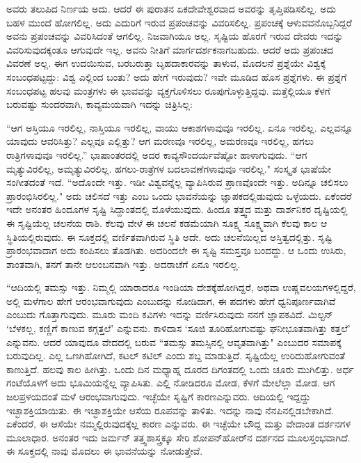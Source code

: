 ಅವರು ತಲುಪಿದ ನಿರ್ಣಯ ಅದು. ಆದರೆ ಈ ಪುರಾತನ ಏಕದೇವೇಶ್ವರವಾದ ಅವರನ್ನು ತೃಪ್ತಿಪಡಿಸಲಿಲ್ಲ. ಅದು ಬಹಳ ಮುಂದೆ ಹೋಗಲಿಲ್ಲ. ಅದು ಎದುರಿಗೆ ಇರುವ ಪ್ರಪಂಚವನ್ನು ವಿವರಿಸಲಿಲ್ಲ. ಪ್ರಪಂಚಕ್ಕೆ ಆಳುವವನೊಬ್ಬನಿದ್ದರೆ ಅವನು ಪ್ರಪಂಚವನ್ನು ವಿವರಿಸಿದಂತೆ ಆಗಲಿಲ್ಲ. ನಿಜವಾಗಿಯೂ ಅಲ್ಲ. ಸೃಷ್ಟಿಯ ಹೊರಗೆ ಇರುವ ದೇವರು ಇದನ್ನು ವಿವರಿಸುವುದಕ್ಕಂತೂ ಆಗುವುದೇ ಇಲ್ಲ. ಅವನು ನೀತಿಗೆ ಮಾರ್ಗದರ್ಶಕನಾಗಬಹುದು. ಆದರೆ ಅದು ಪ್ರಪಂಚದ ವಿವರಣೆ ಅಲ್ಲ. ಈಗ ಉದಯಿಸುವ, ಬರಬರುತ್ತಾ ಬೃಹದಾಕಾರವನ್ನು ತಾಳುವ, ಮೊದಲನೆ ಪ್ರಶ್ನೆಯೇ ವಿಶ್ವಕ್ಕೆ ಸಂಬಂಧಪಟ್ಟದ್ದು: ವಿಶ್ವ ಎಲ್ಲಿಂದ ಬಂತು? ಅದು ಹೇಗೆ ಇರುವುದು? ಇವೇ ಮೂಡಿದ ಹೊಸ ಪ್ರಶ್ನೆಗಳು. ಈ ಪ್ರಶ್ನೆಗೆ ಸಂಬಂಧಪಟ್ಟ ಹಲವು ಮಂತ್ರಗಳು ಈ ಭಾವವನ್ನು ವ್ಯಕ್ತಗೊಳಿಸಲು ರೂಪುಗೊಳ್ಳುತ್ತಿದ್ದವು. ಮತ್ತೆಲ್ಲಿಯೂ ಕೆಳಗೆ ಬರುವಷ್ಟು ಸುಂದರವಾಗಿ, ಕಾವ್ಯಮಯವಾಗಿ ಇದನ್ನು ಚಿತ್ರಿಸಿಲ್ಲ:

“ಆಗ ಅಸ್ತಿಯೂ ಇರಲಿಲ್ಲ, ನಾಸ್ತಿಯೂ ಇರಲಿಲ್ಲ, ವಾಯು ಆಕಾಶಗಳಾವುವೂ ಇರಲಿಲ್ಲ. ಏನೂ ಇರಲಿಲ್ಲ. ಎಲ್ಲವನ್ನೂ ಯಾವುದು ಆವರಿಸಿತ್ತು? ಎಲ್ಲವೂ ಎಲ್ಲಿತ್ತು? ಆಗ ಮರಣವೂ ಇರಲಿಲ್ಲ, ಅಮರಣವೂ ಇರಲಿಲ್ಲ, ಹಗಲು ರಾತ್ರಿಗಳಾವುವೂ ಇರಲಿಲ್ಲ.” ಭಾಷಾಂತರದಲ್ಲಿ ಅದರ ಕಾವ್ಯಸೌಂದರ್ಯವೆಷ್ಟೋ ಹಾಳಾಗುವುದು. “ಆಗ ಮೃತ್ಯುವಿರಲಿಲ್ಲ, ಅಮೃತ್ಯುವಿರಲಿಲ್ಲ. ಹಗಲು-ರಾತ್ರೆಗಳ ಬದಲಾವಣೆಗಳಾವುವೂ ಇರಲಿಲ್ಲ." ಸಂಸ್ಕೃತ ಭಾಷೆಯೇ ಸಂಗೀತದಂತೆ ಇದೆ. “ಅದೊಂದೇ ಇತ್ತು. ಇಡೀ ವಿಶ್ವವನ್ನೆಲ್ಲ ವ್ಯಾಪಿಸಿರುವ ಪ್ರಾಣವೊಂದೇ ಇತ್ತು. ಅದಿನ್ನೂ ಚಲಿಸಲು ಪ್ರಾರಂಭಿಸಿರಲಿಲ್ಲ." ಅದು ಚಲಿಸದೆ ಇತ್ತು ಎಂಬ ಒಂದು ಭಾವನೆಯನ್ನು ಜ್ಞಾಪಕದಲ್ಲಿಡುವುದು ಒಳ್ಳೆಯದು. ಏಕೆಂದರೆ ಇದೇ ಅನಂತರ ಹಿಂದೂಗಳ ಸೃಷ್ಟಿ ಸಿದ್ದಾಂತದಲ್ಲಿ ಮೊಳೆಯುವುದು. ಹಿಂದೂ ತತ್ತ್ವದ ಮತ್ತು ದಾರ್ಶನಿಕರ ದೃಷ್ಟಿಯಲ್ಲಿ ಈ ಸೃಷ್ಟಿಯೆಲ್ಲ ಚಲನೆಯ ರಾಶಿ. ಕೆಲವು ವೇಳೆ ಈ ಚಲನೆ ಕಡಮೆಯಾಗಿ ಸೂಕ್ಷ್ಮ ಸೂಕ್ಷ್ಮವಾಗಿ ಕೆಲವು ಕಾಲ ಆ ಸ್ಥಿತಿಯಲ್ಲಿರುವುದು. ಈ ಸೂಕ್ತದಲ್ಲಿ ವರ್ಣಿತವಾಗಿರುವ ಸ್ಥಿತಿ ಅದೇ. ಅದು ಚಲನೆಯಿಲ್ಲದ ಅಸ್ತಿತ್ವದಲ್ಲಿತ್ತು. ಸೃಷ್ಟಿ ಪ್ರಾರಂಭವಾದಾಗ ಅದು ಕಂಪಿಸಲು ತೊಡಗಿತು. ಅದರಿಂದಲೇ ಈ ಸೃಷ್ಟಿ ಸಮಸ್ತವೂ ಬಂದದ್ದು. ಆ ಒಂದು ಉಸಿರು, ಶಾಂತವಾಗಿ, ತನಗೆ ತಾನೇ ಆಲಂಬನವಾಗಿ ಇತ್ತು. ಅದರಾಚೆಗೆ ಏನೂ ಇರಲಿಲ್ಲ.

“ಆದಿಯಲ್ಲಿ ತಮಸ್ಸು ಇತ್ತು. ನಿಮ್ಮಲ್ಲಿ ಯಾರಾದರೂ ಇಂಡಿಯಾ ದೇಶಕ್ಕೆ\break ಹೋಗಿದ್ದರೆ, ಅಥವಾ ಉಷ್ಣವಲಯಗಳಲ್ಲಿದ್ದರೆ, ಅಲ್ಲಿ ಮಳೆಗಾಲ ಹೇಗೆ ಆರಂಭವಾಗುವುದು ಎಂಬುದನ್ನು ನೋಡಿದಾಗ, ಈ ಪದಗಳು ಹೇಗೆ ಧ್ವನಿಪೂರ್ಣವಾಗಿವೆ ಎಂಬುದು ಗೊತ್ತಾಗುವುದು. ಮೂರು ಮಂದಿ ಕವಿಗಳು ಇದನ್ನು ವರ್ಣಿಸಿರುವುದು ನನಗೆ ಜ್ಞಾಪಕವಿದೆ. ಮಿಲ್ಟನ್  `ಬೆಳಕಲ್ಲ, ಕಣ್ಣಿಗೆ ಕಾಣುವ ಕಗ್ಗತ್ತಲೆ' ಎನ್ನುವನು. ಕಾಳಿದಾಸ `ಸೂಜಿ ತೂರಿಹೋಗುವಷ್ಟು ಘನೀಭೂತವಾಗಿತ್ತು ಕತ್ತಲೆ' ಎನ್ನುವನು. ಆದರೆ ಯಾವುದೂ ವೇದದಲ್ಲಿ ಬರುವ “ತಮಸ್ಸು ತಮಸ್ಸಿನಲ್ಲಿ ಆವೃತವಾಗಿತ್ತು" ಎಂಬುದರ ಸಮಾಪಕ್ಕೆ ಬರುವುದಿಲ್ಲ. ಎಲ್ಲ ಒಣಗಿಹೋಗಿದೆ, ಕಟಲ್ ಕಟಿಲ್ ಎಂದು ಶಬ್ದ ಮಾಡುತ್ತಿದೆ. ಸೃಷ್ಟಿಯೆಲ್ಲ ಉರಿದುಹೋಗುವಂತೆ ಕಾಣುತ್ತಿದೆ. ಹಲವು ಕಾಲ ಹೀಗಿತ್ತು. ಒಂದು ದಿನ ಮಧ್ಯಾಹ್ನ ದೂರದ ದಿಗಂತದಲ್ಲಿ ಒಂದು ಚೂರು ಮುಗಿಲಿತ್ತು. ಅರ್ಧ ಗಂಟೆಯೊಳಗೆ ಅದು ಭೂಮಿಯನ್ನೆಲ್ಲ ವ್ಯಾಪಿಸಿತು. ಎಲ್ಲಿ ನೋಡಿದರೂ ಮೋಡ, ಕೆಳಗೆ ಮೇಲೆಲ್ಲಾ ಮೋಡ. ಆಗ ಜಲಪ್ರಳಯದಂತೆ ಮಳೆ ಆರಂಭವಾಗುವುದು. ಇಚ್ಛೆಯೇ ಸೃಷ್ಟಿಗೆ ಕಾರಣ\break ಎನ್ನುವರು. ಆದಿಯಲ್ಲಿ ಇದ್ದದ್ದು ಇಚ್ಛಾಶಕ್ತಿಯಾಯಿತು. ಈ ಇಚ್ಛಾಶಕ್ತಿಯೇ ಆಸೆಯ ರೂಪವನ್ನು ತಾಳಿತು. ಇದನ್ನು ನಾವು ನೆನಪಿನಲ್ಲಿಡಬೇಕಾಗಿದೆ. ಏಕೆಂದರೆ, ಈ ಆಸೆಯೇ ನಮ್ಮಲ್ಲಿರುವುದಕ್ಕೆಲ್ಲ ಕಾರಣ ಎನ್ನುವರು. ಈ ಇಚ್ಛೆಯೇ ಬೌದ್ದ ಮತ್ತು ವೇದಾಂತ ದರ್ಶನಗಳ ಮೂಲಾಧಾರ. ಅನಂತರ ಇದು ಜರ್ಮನ್ ತತ್ತ್ವಶಾಸ್ತ್ರಕ್ಕೂ ಸೇರಿ ಶೋಪನ್‌ಹೋರ್‌ನ ದರ್ಶನದ ಮೂಲಸ್ತಂಭವಾಗಿದೆ. ಈ ಸೂಕ್ತದಲ್ಲಿ ನಾವು ಮೊದಲು ಈ ಭಾವನೆಯನ್ನು ನೋಡುತ್ತೇವೆ.

